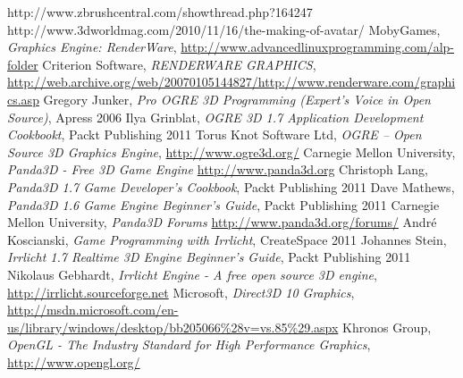 \documentclass[11pt]{mwrep}
\begin{document}
\begin{thebibliography}{99}

 http://www.zbrushcentral.com/showthread.php?164247
 http://www.3dworldmag.com/2010/11/16/the-making-of-avatar/
 MobyGames, \textit{Graphics Engine: RenderWare}, \url{http://www.advancedlinuxprogramming.com/alp-folder}
 Criterion Software, \textit{RENDERWARE GRAPHICS}, \url{http://web.archive.org/web/20070105144827/http://www.renderware.com/graphics.asp}
 Gregory Junker, \textit{Pro OGRE 3D Programming (Expert's Voice in Open Source)}, Apress 2006
 Ilya Grinblat, \textit{OGRE 3D 1.7 Application Development Cookbookt}, Packt Publishing 2011
 Torus Knot Software Ltd, \textit{OGRE -- Open Source 3D Graphics Engine}, \url{http://www.ogre3d.org/}
 Carnegie Mellon University, \textit{Panda3D - Free 3D Game Engine} \url{http://www.panda3d.org}
 Christoph Lang, \textit{Panda3D 1.7 Game Developer's Cookbook}, Packt Publishing 2011
 Dave Mathews, \textit{Panda3D 1.6 Game Engine Beginner's Guide}, Packt Publishing 2011
 Carnegie Mellon University, \textit{Panda3D Forums} \url{http://www.panda3d.org/forums/}
 André Koscianski, \textit{Game Programming with Irrlicht}, CreateSpace 2011
 Johannes Stein, \textit{Irrlicht 1.7 Realtime 3D Engine Beginner's Guide}, Packt Publishing 2011
 Nikolaus Gebhardt, \textit{Irrlicht Engine - A free open source 3D engine}, \url{http://irrlicht.sourceforge.net}
 Microsoft, \textit{Direct3D 10 Graphics}, \url{http://msdn.microsoft.com/en-us/library/windows/desktop/bb205066%28v=vs.85%29.aspx}
 Khronos Group, \textit{OpenGL - The Industry Standard for High Performance Graphics}, \url{http://www.opengl.org/}

\end{thebibliography}

\end{document}
